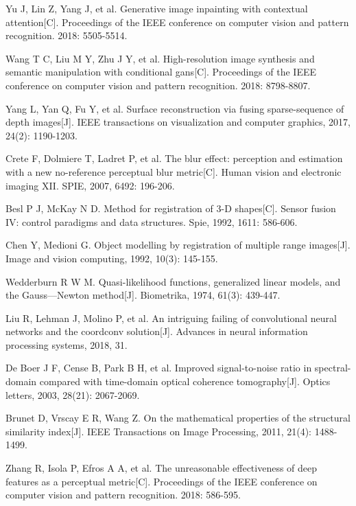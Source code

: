 Yu J, Lin Z, Yang J, et al. Generative image inpainting with contextual attention[C]. Proceedings of the IEEE conference on computer vision and pattern recognition. 2018: 5505-5514.

Wang T C, Liu M Y, Zhu J Y, et al. High-resolution image synthesis and semantic manipulation with conditional gans[C]. Proceedings of the IEEE conference on computer vision and pattern recognition. 2018: 8798-8807.


Yang L, Yan Q, Fu Y, et al. Surface reconstruction via fusing sparse-sequence of depth images[J]. IEEE transactions on visualization and computer graphics, 2017, 24(2): 1190-1203.



Crete F, Dolmiere T, Ladret P, et al. The blur effect: perception and estimation with a new no-reference perceptual blur metric[C]. Human vision and electronic imaging XII. SPIE, 2007, 6492: 196-206.


Besl P J, McKay N D. Method for registration of 3-D shapes[C]. Sensor fusion IV: control paradigms and data structures. Spie, 1992, 1611: 586-606.


Chen Y, Medioni G. Object modelling by registration of multiple range images[J]. Image and vision computing, 1992, 10(3): 145-155.

Wedderburn R W M. Quasi-likelihood functions, generalized linear models, and the Gauss—Newton method[J]. Biometrika, 1974, 61(3): 439-447.


Liu R, Lehman J, Molino P, et al. An intriguing failing of convolutional neural networks and the coordconv solution[J]. Advances in neural information processing systems, 2018, 31.

De Boer J F, Cense B, Park B H, et al. Improved signal-to-noise ratio in spectral-domain compared with time-domain optical coherence tomography[J]. Optics letters, 2003, 28(21): 2067-2069.

Brunet D, Vrscay E R, Wang Z. On the mathematical properties of the structural similarity index[J]. IEEE Transactions on Image Processing, 2011, 21(4): 1488-1499.

Zhang R, Isola P, Efros A A, et al. The unreasonable effectiveness of deep features as a perceptual metric[C]. Proceedings of the IEEE conference on computer vision and pattern recognition. 2018: 586-595.

